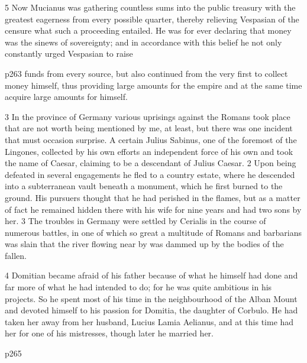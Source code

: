 5
Now Mucianus was gathering countless sums into the public treasury with the greatest eagerness from every possible quarter, thereby relieving Vespasian of the censure what such a proceeding entailed. He was for ever declaring that money was the sinews of sovereignty; and in accordance with this belief he not only constantly urged Vespasian to raise

p263 funds from every source, but also continued from the very first to collect money himself, thus providing large amounts for the empire and at the same time acquire large amounts for himself.

3
In the province of Germany various uprisings against the Romans took place that are not worth being mentioned by me, at least, but there was one incident that must occasion surprise. A certain Julius Sabinus, one of the foremost of the Lingones, collected by his own efforts an independent force of his own and took the name of Caesar, claiming to be a descendant of Julius Caesar. 2 Upon being defeated in several engagements he fled to a country estate, where he descended into a subterranean vault beneath a monument, which he first burned to the ground. His pursuers thought that he had perished in the flames, but as a matter of fact he remained hidden there with his wife for nine years and had two sons by her. 3 The troubles in Germany were settled by Cerialis in the course of numerous battles, in one of which so great a multitude of Romans and barbarians was slain that the river flowing near by was dammed up by the bodies of the fallen.

4
Domitian became afraid of his father because of what he himself had done and far more of what he had intended to do; for he was quite ambitious in his projects. So he spent most of his time in the neighbourhood of the Alban Mount and devoted himself to his passion for Domitia, the daughter of Corbulo. He had taken her away from her husband, Lucius Lamia Aelianus, and at this time had her for one of his mistresses, though later he married her.

p265

